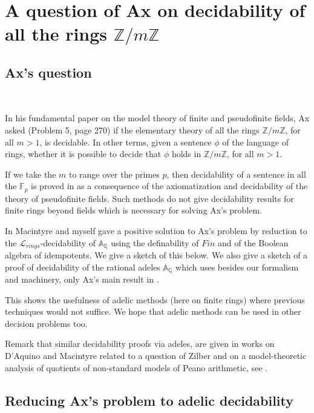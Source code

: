 \documentclass[12pt]{amsart}
\def\A{\mathbb{A}}
\def\F{\mathbb{F}}
\def\Z{\mathbb{Z}}
\def\cL{\mathcal{L}}
\def\Q{\mathbb{Q}}
\def\F{\mathbb{F}}
\def\cL{\mathcal{L}}
\numberwithin{equation}{section}
\begin{document}
\section{\bf A question of Ax on decidability of all the rings $\Z/m\Z$}\label{sec-ax}

\medskip

\subsection{\bf Ax's question}\label{ssec-axq} 

\

\medskip

In his fundamental paper \cite{ax} on the model theory of finite and pseudofinite fields, Ax asked (Problem 5, page 270) if the elementary theory of all the rings $\Z/m\Z$, for all $m>1$, is decidable. In other terms, given a sentence $\phi$ of the language of rings, whether it is possible to decide that $\phi$ holds in $\Z/m\Z$, for all $m>1$. 

If we take the $m$ to range over the primes $p$, then decidability of a sentence in all the $\F_p$ is proved in 
\cite{ax} as a consequence of the axiomatization and decidability of the theory of pseudofinite fields. Such methods do not give decidability results for finite rings beyond fields which is necessary for solving Ax's problem. 

In \cite{DM-ad} Macintyre and myself gave a positive solution to Ax's problem by reduction to the $\cL_{rings}$-decidability of $\A_{\Q}$ using the definability of $Fin$ and of the Boolean algebra of idempotents. We give a sketch of this below. 
We also give a sketch of a proof of decidability of the rational adeles $\A_{\Q}$ which uses besides our formalism and machinery, only Ax's main result in \cite{ax}. 

This shows the usefulness of adelic methods (here on finite rings) where previous techniques would not suffice. We hope that adelic methods can be used in other decision problems too. 

Remark that 
similar decidability proofs via adeles, are given in works on D'Aquino and Macintyre related to a question of Zilber and on a model-theoretic analysis of quotients of non-standard models of Peano arithmetic, see \cite{PDAJM}.

\medskip

\subsection{\bf Reducing Ax's problem to adelic decidability}
\end{document}
